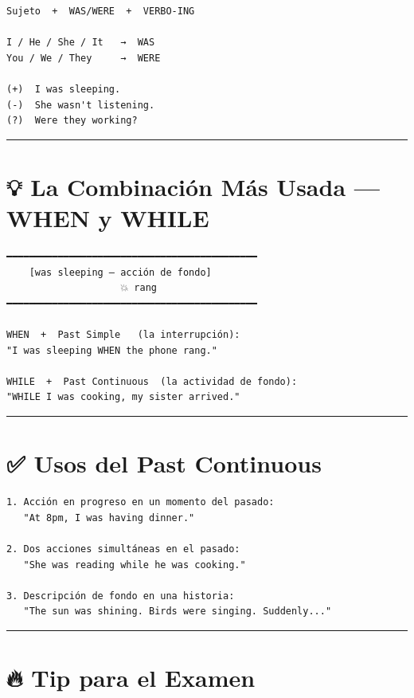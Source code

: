 \documentclass[
  spanish,
  letterpaper,
]{scrbook}
\begin{document}
\begin{verbatim}
Sujeto  +  WAS/WERE  +  VERBO-ING

I / He / She / It   →  WAS
You / We / They     →  WERE

(+)  I was sleeping.
(-)  She wasn't listening.
(?)  Were they working?
\end{verbatim}

\begin{center}\rule{0.5\linewidth}{0.5pt}\end{center}

\section{💡 La Combinación Más Usada --- WHEN y
WHILE}\label{la-combinaciuxf3n-muxe1s-usada-when-y-while}

\begin{verbatim}
━━━━━━━━━━━━━━━━━━━━━━━━━━━━━━━━━━━━━━━━━━━━
    [was sleeping — acción de fondo]
                    💥 rang
━━━━━━━━━━━━━━━━━━━━━━━━━━━━━━━━━━━━━━━━━━━━

WHEN  +  Past Simple   (la interrupción):
"I was sleeping WHEN the phone rang."

WHILE  +  Past Continuous  (la actividad de fondo):
"WHILE I was cooking, my sister arrived."
\end{verbatim}

\begin{center}\rule{0.5\linewidth}{0.5pt}\end{center}

\section{✅ Usos del Past Continuous}\label{usos-del-past-continuous}

\begin{verbatim}
1. Acción en progreso en un momento del pasado:
   "At 8pm, I was having dinner."

2. Dos acciones simultáneas en el pasado:
   "She was reading while he was cooking."

3. Descripción de fondo en una historia:
   "The sun was shining. Birds were singing. Suddenly..."
\end{verbatim}

\begin{center}\rule{0.5\linewidth}{0.5pt}\end{center}

\section{🔥 Tip para el Examen}\label{tip-para-el-examen-2}
\end{document}
